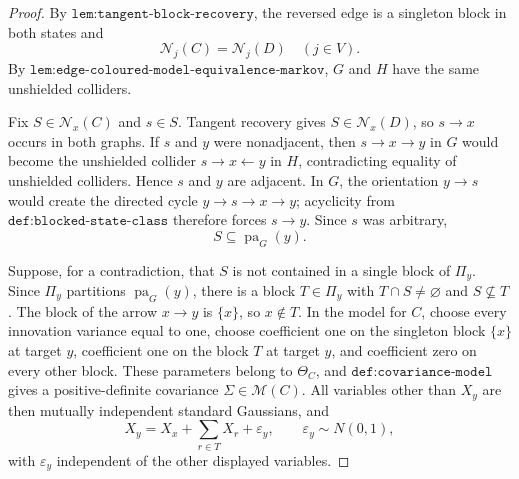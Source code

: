 \documentclass{article}
\begin{document}
\begin{proof}
By \(\texttt{lem:tangent-block-recovery}\), the reversed edge is a singleton block in both states and
\[
 \mathcal N_j(C)=\mathcal N_j(D)\quad(j\in V).
\]
By \(\texttt{lem:edge-coloured-model-equivalence-markov}\), \(G\) and \(H\) have the same unshielded colliders.

Fix \(S\in\mathcal N_x(C)\) and \(s\in S\). Tangent recovery gives \(S\in\mathcal N_x(D)\), so \(s\to x\) occurs in both graphs. If \(s\) and \(y\) were nonadjacent, then \(s\to x\to y\) in \(G\) would become the unshielded collider \(s\to x\leftarrow y\) in \(H\), contradicting equality of unshielded colliders. Hence \(s\) and \(y\) are adjacent. In \(G\), the orientation \(y\to s\) would create the directed cycle \(y\to s\to x\to y\); acyclicity from \(\texttt{def:blocked-state-class}\) therefore forces \(s\to y\). Since \(s\) was arbitrary,
\[
 S\subseteq\operatorname{pa}_G(y).
\]

Suppose, for a contradiction, that \(S\) is not contained in a single block of \(\Pi_y\). Since \(\Pi_y\) partitions \(\operatorname{pa}_G(y)\), there is a block \(T\in\Pi_y\) with \(T\cap S\neq\varnothing\) and \(S\nsubseteq T\). The block of the arrow \(x\to y\) is \(\{x\}\), so \(x\notin T\). In the model for \(C\), choose every innovation variance equal to one, choose coefficient one on the singleton block \(\{x\}\) at target \(y\), coefficient one on the block \(T\) at target \(y\), and coefficient zero on every other block. These parameters belong to \(\Theta_C\), and \(\texttt{def:covariance-model}\) gives a positive-definite covariance \(\Sigma\in\mathcal M(C)\). All variables other than \(X_y\) are then mutually independent standard Gaussians, and
\[
 X_y=X_x+\sum_{r\in T}X_r+\varepsilon_y,
 \qquad \varepsilon_y\sim N(0,1),
\]
with \(\varepsilon_y\) independent of the other displayed variables.


\end{proof}
\end{document}
